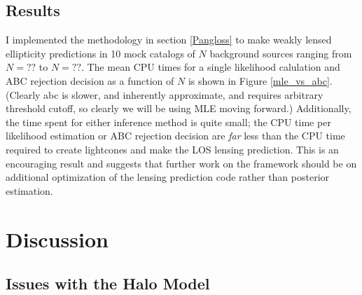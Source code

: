 \documentclass[%
 reprint,
 amsmath,amssymb,
 aps,nofootinbib
]{revtex4-1}
\begin{document}
\subsection{Results}

I implemented the methodology in section \ref{Pangloss} to make weakly lensed ellipticity predictions in 10 mock catalogs of $N$ background sources ranging from $N=??$ to $N=??$. The mean CPU times for a single likelihood calulation and ABC rejection decision as a function of $N$ is shown in Figure \ref{mle_vs_abc}. (Clearly abc is slower, and inherently approximate, and requires arbitrary threshold cutoff, so clearly we will be using MLE moving forward.) Additionally, the time spent for either inference method is quite small; the CPU time per likelihood estimation or ABC rejection decision are \textit{far} less than the CPU time required to create lightcones and make the LOS lensing prediction. This is an encouraging result and suggests that further work on the framework should be on additional optimization of the lensing prediction code rather than posterior estimation.



\section{Discussion} \label{discussion}


\subsection{Issues with the Halo Model}
\end{document}
